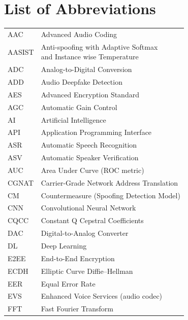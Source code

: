 \newpage
{}
\section*{List of Abbreviations}

\begin{longtable}{@{}p{5cm} p{11cm}}

AAC       & Advanced Audio Coding \\[0.2cm]
AASIST     & \parbox[t]{12cm}{
            Anti-spoofing with Adaptive Softmax\\
            and Instance wise Temperature\vspace{0.4cm}
            }\\
ADC       & Analog-to-Digital Conversion \\[0.2cm]
ADD       & Audio Deepfake Detection \\[0.2cm]
AES       & Advanced Encryption Standard \\[0.2cm]
AGC       & Automatic Gain Control \\[0.2cm]
AI        & Artificial Intelligence \\[0.2cm]
API       & Application Programming Interface \\[0.2cm]
ASR       & Automatic Speech Recognition \\[0.2cm]
ASV       & Automatic Speaker Verification \\[0.2cm]
AUC       & Area Under Curve (ROC metric) \\[0.2cm]
CGNAT     & Carrier-Grade Network Address Translation \\[0.2cm]
CM        & Countermeasure (Spoofing Detection Model) \\[0.2cm]
CNN       & Convolutional Neural Network \\[0.2cm]
CQCC      & Constant Q Cepstral Coefficients \\[0.2cm]
DAC       & Digital-to-Analog Converter \\[0.2cm]
DL        & Deep Learning \\[0.2cm]
E2EE      & End-to-End Encryption \\[0.2cm]
ECDH      & Elliptic Curve Diffie–Hellman \\[0.2cm]
EER       & Equal Error Rate \\[0.2cm]
EVS       & Enhanced Voice Services (audio codec) \\[0.2cm]
FFT       & Fast Fourier Transform \\[0.2cm]

\end{longtable}

